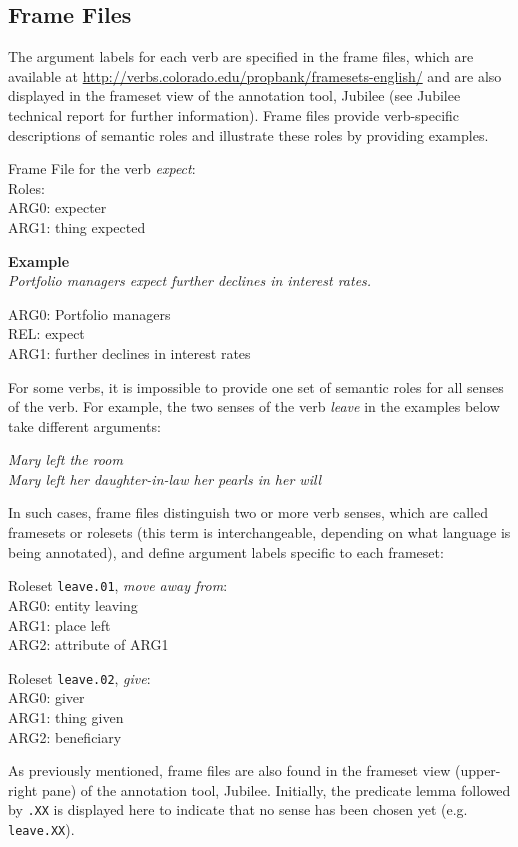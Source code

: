 \documentclass[11pt]{report}
\begin{document}
\subsection{Frame Files}
The argument labels for each verb are specified in the frame files, which are available at \url{http://verbs.colorado.edu/propbank/framesets-english/} and are also displayed in the frameset view of the annotation tool, Jubilee (see Jubilee technical report \cite{choi-09b} for further information).  Frame files provide verb-specific descriptions of semantic roles and illustrate these roles by providing examples. 

Frame File for the verb \textit{expect}:\\
Roles: \\
ARG0: expecter\\
ARG1: thing expected

\textbf{Example}\\
\textit{Portfolio managers expect further declines in interest rates.}

ARG0: Portfolio managers\\
REL: expect\\
ARG1: further declines in interest rates

\noindent For some verbs, it is impossible to provide one set of semantic roles for all senses of the verb. For example, the two senses of the verb \textit{leave} in the examples below take different arguments: 

\textit{Mary left the room}\\
\textit{Mary left her daughter-in-law her pearls in her will}

\noindent In such cases, frame files distinguish two or more verb senses, which are called framesets or rolesets (this term is interchangeable, depending on what language is being annotated), and define argument labels specific to each frameset: 

Roleset \texttt{leave.01}, \textit{move away from}:\\
ARG0: entity leaving\\
ARG1: place left\\
ARG2: attribute of ARG1

Roleset \texttt{leave.02}, \textit{give}:\\
ARG0: giver \\
ARG1: thing given\\
ARG2: beneficiary

As previously mentioned, frame files are also found in the frameset view (upper-right pane) of the annotation tool, Jubilee.  Initially, the predicate lemma followed by {\tt.XX} is displayed here to indicate that no sense has been chosen yet (e.g. {\tt leave.XX}).  
\end{document}
